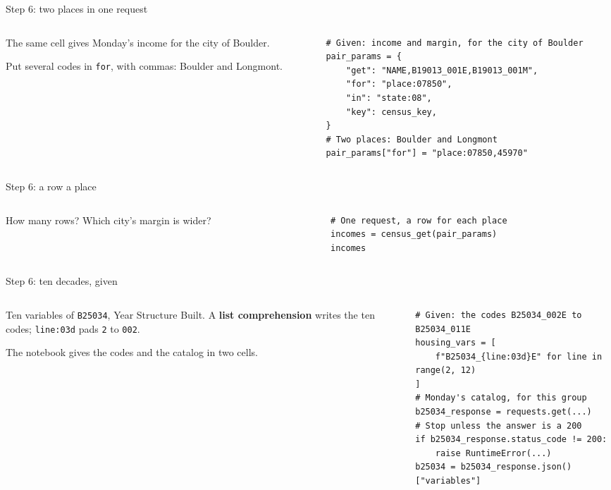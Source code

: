 \documentclass[9pt,aspectratio=169]{beamer}
\begin{document}
\begin{frame}[fragile]{Step 6: two places in one request}
    \begin{columns}[T]
        \begin{column}{0.37\textwidth}
            The same cell gives Monday's income for the city of Boulder.

            \medskip
            Put several codes in \texttt{for}, with commas: Boulder and Longmont.
        \end{column}
        \begin{column}{0.6\textwidth}
\begin{lstlisting}
# Given: income and margin, for the city of Boulder
pair_params = {
    "get": "NAME,B19013_001E,B19013_001M",
    "for": "place:07850",
    "in": "state:08",
    "key": census_key,
}
# Two places: Boulder and Longmont
pair_params["for"] = "place:07850,45970"
\end{lstlisting}
        \end{column}
    \end{columns}
\end{frame}

\begin{frame}[fragile]{Step 6: a row a place}
    \begin{columns}[T]
        \begin{column}{0.37\textwidth}
            How many rows? Which city's margin is wider?
        \end{column}
        \begin{column}{0.6\textwidth}
\begin{lstlisting}
# One request, a row for each place
incomes = census_get(pair_params)
incomes
\end{lstlisting}
        \end{column}
    \end{columns}
\end{frame}

\begin{frame}[fragile]{Step 6: ten decades, given}
    \begin{columns}[T]
        \begin{column}{0.37\textwidth}
            Ten variables of \texttt{B25034}, Year Structure Built. A \textbf{list comprehension} writes the ten codes; \texttt{line:03d} pads \texttt{2} to \texttt{002}.

            \medskip
            The notebook gives the codes and the catalog in two cells.
        \end{column}
        \begin{column}{0.6\textwidth}
\begin{lstlisting}
# Given: the codes B25034_002E to B25034_011E
housing_vars = [
    f"B25034_{line:03d}E" for line in range(2, 12)
]
# Monday's catalog, for this group
b25034_response = requests.get(...)
# Stop unless the answer is a 200
if b25034_response.status_code != 200:
    raise RuntimeError(...)
b25034 = b25034_response.json()["variables"]
\end{lstlisting}
        \end{column}
    \end{columns}
\end{frame}
\end{document}
